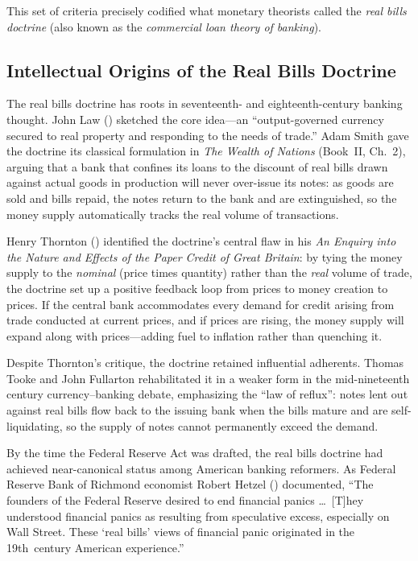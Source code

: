\documentclass[12pt]{article}
\begin{document}
This set of criteria precisely codified what monetary theorists called the
\emph{real bills doctrine} (also known as the \emph{commercial loan theory of
banking}).

\subsection{Intellectual Origins of the Real Bills Doctrine}

The real bills doctrine has roots in seventeenth- and eighteenth-century banking
thought.  John Law (\citeyear{law1720}) sketched the core idea---an
``output-governed currency secured to real property and responding to the needs of
trade.''  Adam Smith gave the doctrine its classical formulation in \emph{The
Wealth of Nations} (Book~II, Ch.~2), arguing that a bank that confines its loans to
the discount of real bills drawn against actual goods in production will never
over-issue its notes: as goods are sold and bills repaid, the notes return to the
bank and are extinguished, so the money supply automatically tracks the real volume
of transactions.

Henry Thornton (\citeyear{thornton1802}) identified the doctrine's central flaw
in his \emph{An Enquiry into the Nature and Effects of the Paper Credit of Great
Britain}: by tying the money supply to the \emph{nominal} (price times quantity)
rather than the \emph{real} volume of trade, the doctrine set up a positive
feedback loop from prices to money creation to prices.  If the central bank
accommodates every demand for credit arising from trade conducted at current prices,
and if prices are rising, the money supply will expand along with prices---adding
fuel to inflation rather than quenching it.

Despite Thornton's critique, the doctrine retained influential adherents.  Thomas
Tooke and John Fullarton rehabilitated it in a weaker form in the mid-nineteenth
century currency--banking debate, emphasizing the ``law of reflux'': notes lent
out against real bills flow back to the issuing bank when the bills mature and are
self-liquidating, so the supply of notes cannot permanently exceed the demand.

By the time the Federal Reserve Act was drafted, the real bills doctrine had
achieved near-canonical status among American banking reformers.  As Federal Reserve
Bank of Richmond economist Robert Hetzel (\citeyear{hetzel2014}) documented, ``The
founders of the Federal Reserve desired to end financial panics \ldots\ [T]hey
understood financial panics as resulting from speculative excess, especially on
Wall Street.  These `real bills' views of financial panic originated in the
19th~century American experience.''
\end{document}

